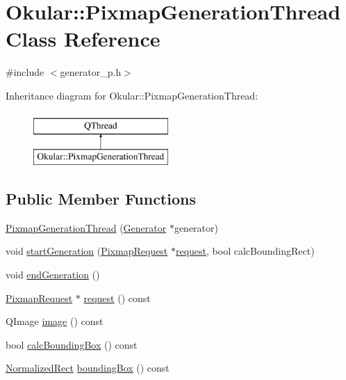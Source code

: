 \hypertarget{classOkular_1_1PixmapGenerationThread}{\section{Okular\+:\+:Pixmap\+Generation\+Thread Class Reference}
\label{classOkular_1_1PixmapGenerationThread}
}


{\ttfamily \#include $<$generator\+\_\+p.\+h$>$}

Inheritance diagram for Okular\+:\+:Pixmap\+Generation\+Thread\+:\begin{figure}[H]
\begin{center}
\leavevmode
\includegraphics[height=2.000000cm]{classOkular_1_1PixmapGenerationThread}
\end{center}
\end{figure}
\subsection*{Public Member Functions}
\begin{DoxyCompactItemize}
\item 
\hyperlink{classOkular_1_1PixmapGenerationThread_a85f8dd3655a02eea9591277ce066c168}{Pixmap\+Generation\+Thread} (\hyperlink{classOkular_1_1Generator}{Generator} $\ast$generator)
\item 
void \hyperlink{classOkular_1_1PixmapGenerationThread_a577f6af025efc8c54567fb86f7e13bd0}{start\+Generation} (\hyperlink{classOkular_1_1PixmapRequest}{Pixmap\+Request} $\ast$\hyperlink{classOkular_1_1PixmapGenerationThread_a1238aa6b9c9aa1e7c1a5fb6b9592afab}{request}, bool calc\+Bounding\+Rect)
\item 
void \hyperlink{classOkular_1_1PixmapGenerationThread_a95d2f82e7cb4e358437b15c2f7e8fe2b}{end\+Generation} ()
\item 
\hyperlink{classOkular_1_1PixmapRequest}{Pixmap\+Request} $\ast$ \hyperlink{classOkular_1_1PixmapGenerationThread_a1238aa6b9c9aa1e7c1a5fb6b9592afab}{request} () const 
\item 
Q\+Image \hyperlink{classOkular_1_1PixmapGenerationThread_a3a7901f1b19e8ad3a0172bf139eec428}{image} () const 
\item 
bool \hyperlink{classOkular_1_1PixmapGenerationThread_a4dcec1fa684a0c71be9d592d2d021a69}{calc\+Bounding\+Box} () const 
\item 
\hyperlink{classOkular_1_1NormalizedRect}{Normalized\+Rect} \hyperlink{classOkular_1_1PixmapGenerationThread_a970537f1118bb955a1e0ba2c5637e4f7}{bounding\+Box} () const 
\end{DoxyCompactItemize}
